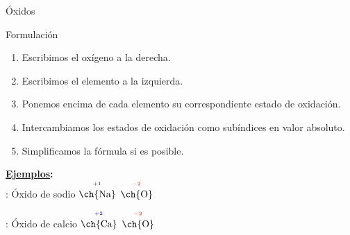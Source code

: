 \documentclass{beamer}
\newcommand*{\numberballmDarkTeal}{\protect\cnumero{\arabic*}{mDarkTeal}}
\newcommand{\eo}[3]{$\overset{^{\color{#1}#2}}{\text{\ch{#3}}}$}
\newcommand{\nline}[1][6pt]{\\[#1]}
\begin{document}
\begin{frame}[t]{Óxidos}
    \begin{exampleblock}{\Large Formulación}
        \begin{enumerate}[label=\numberballmDarkTeal]
            \item Escribimos el oxígeno a la derecha.
            \item Escribimos el elemento a la izquierda.
            \item Ponemos encima de cada elemento su correspondiente estado de oxidación.
            \item Intercambiamos los estados de oxidación como subíndices en valor absoluto.
            \item Simplificamos la fórmula si es posible.
        \end{enumerate}
        \textbf{\uline{Ejemplos}:}\nline
         : Óxido de sodio \ch{->}  \eo{blue}{+1}{Na} \eo{red}{-2}{O}  \ch{->} 

         : Óxido de calcio \ch{->} \eo{blue}{+2}{Ca} \eo{red}{-2}{O}  \ch{->}  \ch{->} 
    \end{exampleblock}
\end{frame}
\end{document}
